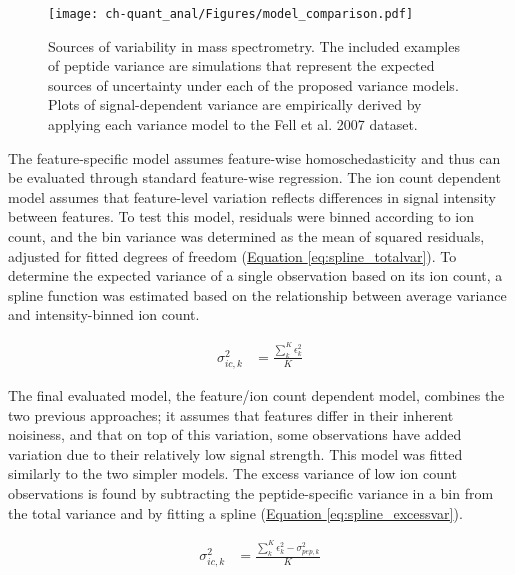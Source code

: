 \begin{figure}[h!]
\begin{center}
\texttt{[image: ch-quant\_anal/Figures/model\_comparison.pdf]}
\caption[Sources of variability in mass spectrometry]{Sources of variability in mass spectrometry. The included examples of peptide variance are simulations that represent the expected sources of uncertainty under each of the proposed variance models. Plots of signal-dependent variance are empirically derived by applying each variance model to the Fell et al. 2007 dataset.}
\label{ch-quant_anal:modelComparison}
\end{center}
\end{figure}

The feature-specific model assumes feature-wise homoschedasticity and thus can be evaluated through standard feature-wise regression. The ion count dependent model assumes that feature-level variation reflects differences in signal intensity between features. To test this model, residuals were binned according to ion count, and the bin variance was determined as the mean of squared residuals, adjusted for fitted degrees of freedom (\hyperref[eq:spline_totalvar]{Equation \ref{eq:spline_totalvar}}). To determine the expected variance of a single observation based on its ion count, a spline function was estimated based on the relationship between average variance and intensity-binned ion count.

\begin{align}
\sigma^{2}_{ic,k} &= \frac{\sum_{k}^{K}\epsilon_{k}^{2}}{K}\label{eq:spline_totalvar}
\end{align}

The final evaluated model, the feature/ion count dependent model, combines the two previous approaches; it assumes that features differ in their inherent noisiness, and that on top of this variation, some observations have added variation due to their relatively low signal strength. This model was fitted similarly to the two simpler models. The excess variance of low ion count observations is found by subtracting the peptide-specific variance in a bin from the total variance and by fitting a spline (\hyperref[eq:spline_excessvar]{Equation \ref{eq:spline_excessvar}}).

\begin{align}
\sigma^{2}_{ic,k} &= \frac{\sum_{k}^{K}\epsilon_{k}^{2} - \sigma^{2}_{pep,k}}{K}\label{eq:spline_excessvar}
\end{align}


